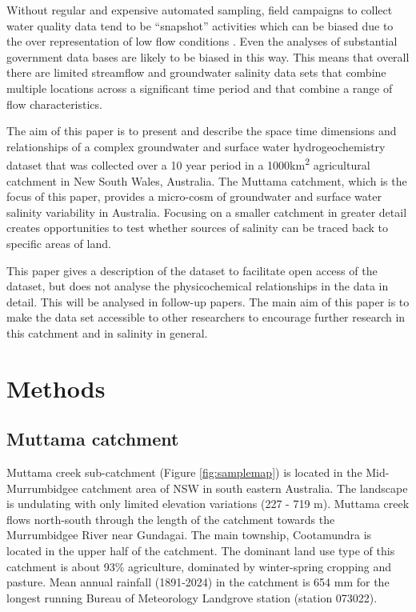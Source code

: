 \documentclass[, manuscript]{copernicus}
\begin{document}
Without regular and expensive automated sampling, field campaigns to
collect water quality data tend to be ``snapshot'' activities
\citep{Grayson1997, Breuer2015, Lyon2008, Cartwright2010, Lintern2018}
which can be biased due to the over representation of low flow
conditions \citep{Lessels2020}. Even the analyses of substantial
government data bases \citep{Lintern2018} are likely to be biased in
this way. This means that overall there are limited streamflow and
groundwater salinity data sets that combine multiple locations across a
significant time period and that combine a range of flow
characteristics.

The aim of this paper is to present and describe the space time
dimensions and relationships of a complex groundwater and surface water
hydrogeochemistry dataset that was collected over a 10 year period in a
1000km\textsuperscript{2} agricultural catchment in New South Wales,
Australia. The Muttama catchment, which is the focus of this paper,
provides a micro-cosm of groundwater and surface water salinity
variability in Australia. Focusing on a smaller catchment in greater
detail creates opportunities to test whether sources of salinity can be
traced back to specific areas of land.

This paper gives a description of the dataset to facilitate open access
of the dataset, but does not analyse the physicochemical relationships
in the data in detail. This will be analysed in follow-up papers. The
main aim of this paper is to make the data set accessible to other
researchers to encourage further research in this catchment and in
salinity in general.

\section{Methods}

\subsection{Muttama catchment}

Muttama creek sub-catchment (Figure \ref{fig:samplemap}) is located in
the Mid-Murrumbidgee catchment area of NSW in south eastern Australia.
The landscape is undulating with only limited elevation variations (227
- 719 m). Muttama creek flows north-south through the length of the
catchment towards the Murrumbidgee River near Gundagai. The main
township, Cootamundra is located in the upper half of the catchment. The
dominant land use type of this catchment is about 93\% agriculture,
dominated by winter-spring cropping and pasture. Mean annual rainfall
(1891-2024) in the catchment is 654 mm for the longest running Bureau of
Meteorology Landgrove station (station 073022).
\end{document}
